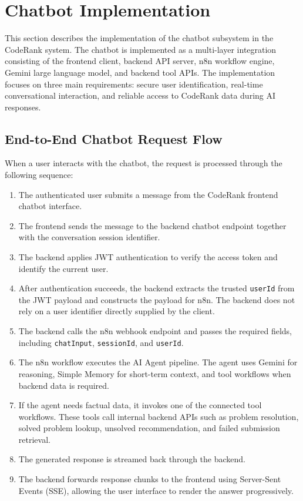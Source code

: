 \section{Chatbot Implementation}

This section describes the implementation of the chatbot subsystem in the CodeRank system. The chatbot is implemented as a multi-layer integration consisting of the frontend client, backend API server, n8n workflow engine, Gemini large language model, and backend tool APIs. The implementation focuses on three main requirements: secure user identification, real-time conversational interaction, and reliable access to CodeRank data during AI responses.

\subsection{End-to-End Chatbot Request Flow}

When a user interacts with the chatbot, the request is processed through the following sequence:

\begin{enumerate}
    \item The authenticated user submits a message from the CodeRank frontend chatbot interface.
    
    \item The frontend sends the message to the backend chatbot endpoint together with the conversation session identifier.
    
    \item The backend applies JWT authentication to verify the access token and identify the current user.
    
    \item After authentication succeeds, the backend extracts the trusted \texttt{userId} from the JWT payload and constructs the payload for n8n. The backend does not rely on a user identifier directly supplied by the client.
    
    \item The backend calls the n8n webhook endpoint and passes the required fields, including \texttt{chatInput}, \texttt{sessionId}, and \texttt{userId}.
    
    \item The n8n workflow executes the AI Agent pipeline. The agent uses Gemini for reasoning, Simple Memory for short-term context, and tool workflows when backend data is required.
    
    \item If the agent needs factual data, it invokes one of the connected tool workflows. These tools call internal backend APIs such as problem resolution, solved problem lookup, unsolved recommendation, and failed submission retrieval.
    
    \item The generated response is streamed back through the backend.
    
    \item The backend forwards response chunks to the frontend using Server-Sent Events (SSE), allowing the user interface to render the answer progressively.
\end{enumerate}

